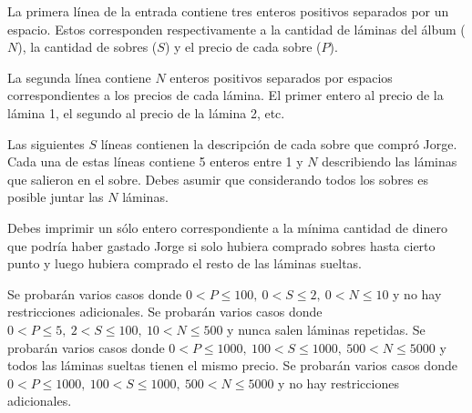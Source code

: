 \documentclass{oci}
\begin{document}
\begin{inputDescription}
La primera línea de la entrada contiene tres enteros positivos separados por un espacio.
Estos corresponden respectivamente a la cantidad de láminas del álbum ($N$), la cantidad de sobres ($S$) y el precio de cada sobre ($P$).

La segunda línea contiene $N$ enteros positivos separados por espacios correspondientes a los precios de cada lámina.
El primer entero al precio de la lámina 1, el segundo al precio de la lámina 2, etc.

Las siguientes $S$ líneas contienen la descripción de cada sobre que compró Jorge.
Cada una de estas líneas contiene 5 enteros entre 1 y $N$ describiendo las láminas que salieron en el sobre.
Debes asumir que considerando todos los sobres es posible juntar las $N$ láminas. 
\end{inputDescription}

\begin{outputDescription}
Debes imprimir un sólo entero correspondiente a la mínima cantidad de dinero que podría haber gastado Jorge si solo hubiera comprado sobres hasta cierto punto y luego hubiera comprado el resto de las láminas sueltas.
\end{outputDescription}

\begin{scoreDescription}
   Se probarán varios casos donde
 $0 < P \leq 100,\ 0 < S \leq 2,\ 0 < N \leq 10$ y no hay restricciones adicionales.
   Se probarán varios casos donde
 $0<P\leq 5,\ 2 < S \leq 100,\ 10 < N \leq 500$ y nunca salen láminas repetidas.
   Se probarán varios casos donde
$0<P\leq 1000,\ 100 < S \leq 1000,\ 500 < N \leq 5000$ y todos las láminas sueltas tienen el mismo precio.
   Se probarán varios casos donde
$0<P\leq 1000,\ 100 < S \leq 1000,\ 500<N\leq 5000$
y no hay restricciones adicionales.
\end{scoreDescription}

\begin{sampleDescription}
\end{sampleDescription}
\end{document}
